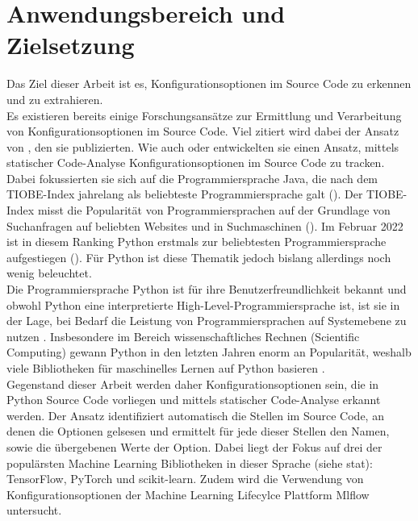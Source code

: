 \documentclass[german,bachelor]{swsLeipzig}
\begin{document}
\section{Anwendungsbereich und Zielsetzung}
Das Ziel dieser Arbeit ist es, Konfigurationsoptionen im Source Code zu erkennen und zu extrahieren. \\

Es existieren bereits einige Forschungsansätze zur Ermittlung und Verarbeitung von Konfigurationsoptionen im Source Code.
Viel zitiert wird dabei der Ansatz von \citeauthor{10.1145/1985793.1985812}, den sie \citeyear{10.1145/1985793.1985812} publizierten.
Wie auch \citeauthor{7774519} oder \citeauthor{8049300} entwickelten sie einen Ansatz, mittels statischer Code-Analyse Konfigurationsoptionen
im Source Code zu tracken.
Dabei fokussierten sie sich auf die Programmiersprache Java, die nach dem TIOBE-Index jahrelang als beliebteste Programmiersprache galt (\citeyear{enwiki:1077809155}).
Der TIOBE-Index misst die Popularität von Programmiersprachen auf der Grundlage von Suchanfragen auf beliebten Websites und in Suchmaschinen (\citeyear{enwiki:1077809155}).
Im Februar 2022 ist in diesem Ranking Python erstmals zur beliebtesten Programmiersprache aufgestiegen (\citeyear{enwiki:1077809155}).
Für Python ist diese Thematik jedoch bislang allerdings noch wenig beleuchtet. \\

Die Programmiersprache Python ist für ihre Benutzerfreundlichkeit bekannt und obwohl Python eine interpretierte High-Level-Programmiersprache ist,
ist sie in der Lage, bei Bedarf die Leistung von Programmiersprachen auf Systemebene zu nutzen \cite[S. 2]{2020}.
Insbesondere im Bereich wissenschaftliches Rechnen (Scientific Computing) gewann Python in den letzten Jahren enorm an Popularität,
weshalb viele Bibliotheken für maschinelles Lernen auf Python basieren \cite[S. 2]{2020}. \\

Gegenstand dieser Arbeit werden daher Konfigurationsoptionen sein, die in Python Source Code vorliegen und mittels statischer Code-Analyse erkannt werden.
Der Ansatz identifiziert automatisch die Stellen im Source Code, an denen die Optionen gelsesen und ermittelt für jede dieser Stellen den Namen,
sowie die übergebenen Werte der Option.
Dabei liegt der Fokus auf drei der populärsten Machine Learning Bibliotheken in dieser Sprache (siehe stat): TensorFlow, PyTorch und scikit-learn.
Zudem wird die Verwendung von Konfigurationsoptionen der Machine Learning Lifecylce Plattform Mlflow untersucht. \\
\end{document}

